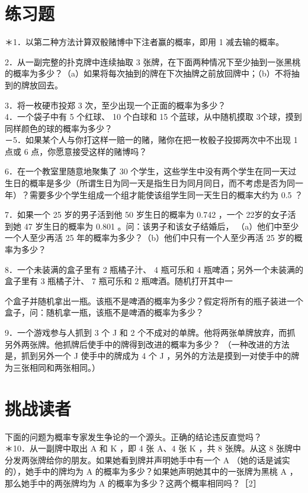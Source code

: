 \section*{练习题}
＊1．以第二种方法计算双骰赌博中下注者赢的概率，即用 1 减去输的概率。

2．从一副完整的扑克牌中连续抽取 3 张牌，在下面两种情况下至少抽到一张黑桃的概率为多少？（a）如果将每次抽到的牌在下次抽牌之前放回牌中；（b）不将抽到的牌放回去。

3．将一枚硬市投郑 3 次，至少出现一个正面的概率为多少？\\
4．一个袋子中有 5 个红球、 10 个白球和 15 个蓝球，从中随机摸取 3个球，摸到同样颜色的球的概率为多少？\\
－5．如果某个人与你打这样一赔一的赌，赌你在把一枚骰子投掷两次中不出现 1 点或 6 点，你愿意接受这样的赌博吗？

6．在一个教室里随意地聚集了 30 个学生，这些学生中没有两个学生在同一天过生日的概率是多少（所谓生日为同一天是指生日为同月同日，而不考虑是否为同一年）？需要多少个学生组成一个组才能使该组学生同一天生日的概率大约为 0.5 ？

7．如果一个 25 岁的男子活到他 50 岁生日的概率为 0.742 ，一个 22岁的女子活到她 47 岁生日的概率为 0.801 。问：该男子和该女子结婚后， （a）他们中至少一个人至少再活 25 年的概率为多少？（b）他们中只有一个人至少再活 25 岁的概率为多少？

8．一个未装满的盒子里有 2 瓶橘子汁、 4 瓶可乐和 4 瓶啤酒；另外一个未装满的盒子里有 3 瓶橘子汁、 7 瓶可乐和 2 瓶啤酒。随机打开其中一

个盒子并随机拿出一瓶。该瓶不是啤酒的概率为多少？假定将所有的瓶子装进一个盒子，问：随机拿一瓶，该瓶不是啤酒的概率为多少？

9．一个游戏参与人抓到 3 个 J 和 2 个不成对的单牌。他将两张单牌放弃，而抓另外两张牌。他抓牌后使手中的牌得到改进的概率为多少？ （一种改进的方法是，抓到另外一个 J 使手中的牌成为 4 个 J ，另外的方法是摸到一对使手中的牌为三张相同和两张相同。）

\section*{挑战读者}
下面的问题为概率专家发生争论的一个源头。正确的结论违反直觉吗？\\
＊10．从一副牌中取出 A 和 K ，即 4 张 $\mathrm{A} 、 4$ 张 K ，共 8 张牌。从这 8 张牌中分发两张牌给你的朋友。如果她看到牌并声明她手中有一个 A （她的话是诚实的），她手中的牌均为 A 的概率为多少？如果她声明她其中的一张牌为黑桃 A ，那么她手中的两张牌均为 A 的概率为多少？这两个概率相同吗？［2］


